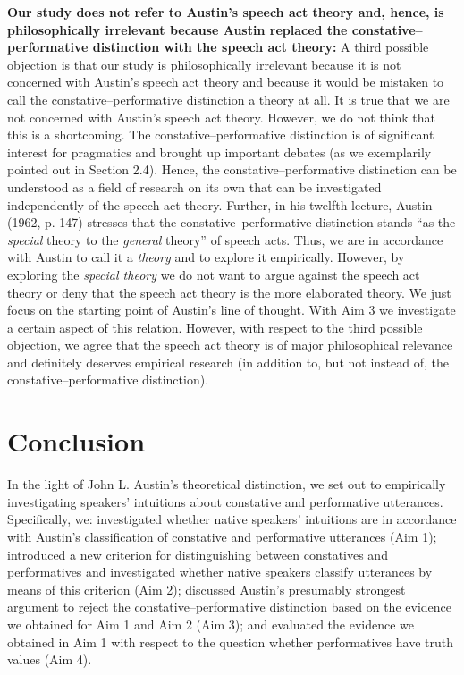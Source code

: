 \documentclass[egregdoesnotlikesansseriftitles,12pt]{scrartcl}
\begin{document}
\noindent\textbf{Our study does not refer to Austin's speech act theory and, hence, is philosophically irrelevant because Austin replaced the constative--performative distinction with the speech act theory:} A third possible objection is that our study is philosophically irrelevant because it is not concerned with Austin's speech act theory and because it would be mistaken to call the constative--performative distinction a theory at all. It is true that we are not concerned with Austin's speech act theory. However, we do not think that this is a shortcoming. The constative--performative distinction is of significant interest for pragmatics and brought up important debates (as we exemplarily pointed out in Section 2.4). Hence, the constative--performative distinction can be understood as a field of research on its own that can be investigated independently of the speech act theory. Further, in his twelfth lecture, Austin (1962, p. 147) stresses that the constative--performative distinction stands ``as the \textit{special} theory to the \textit{general} theory'' of speech acts. Thus, we are in accordance with Austin to call it a \textit{theory} and to explore it empirically. However, by exploring the \textit{special theory} we do not want to argue against the speech act theory or deny that the speech act theory is the more elaborated theory. We just focus on the starting point of Austin's line of thought. With Aim 3 we investigate a certain aspect of this relation. However, with respect to the third possible objection, we agree that the speech act theory is of major philosophical relevance and definitely deserves empirical research (in addition to, but not instead of, the constative--performative distinction).\\ 


\section{Conclusion}\label{sec:conclusion}
In the light of John L. Austin's theoretical distinction, we set out to empirically investigating speakers' intuitions about constative and performative utterances. Specifically, we: investigated whether native speakers' intuitions are in accordance with Austin's classification of constative and performative utterances (Aim 1); introduced a new criterion for distinguishing between constatives and performatives and investigated whether native speakers classify utterances by means of this criterion (Aim 2); discussed Austin's presumably strongest argument to reject the constative--performative distinction based on the evidence we obtained for Aim 1 and Aim 2 (Aim 3); and evaluated the evidence we obtained in Aim 1 with respect to the question whether performatives have truth values (Aim 4).
\end{document}
